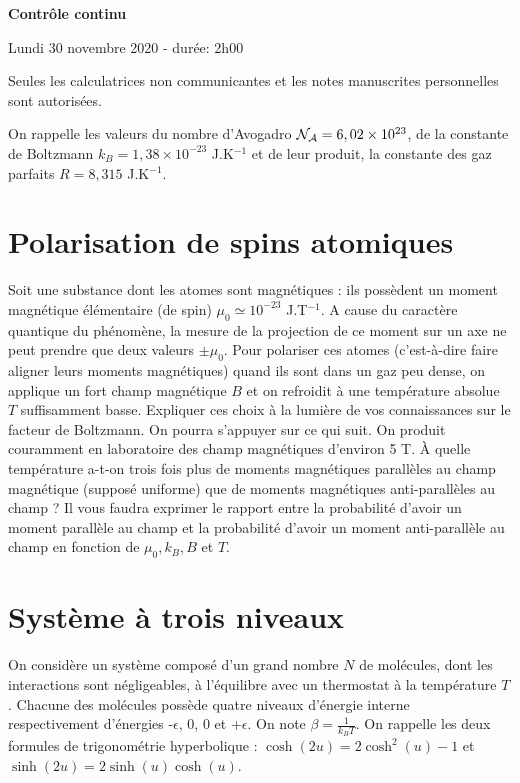 \documentclass[utf8, 11pt]{feuille}
\begin{document}
\begin{center}
    \Large {\bf Contrôle continu}
    
    Lundi 30 novembre 2020 - durée: 2h00
\end{center}

Seules les calculatrices non communicantes et les notes manuscrites personnelles sont autorisées.

On rappelle les valeurs du nombre d'Avogadro ${\cal N_A}=6,02 \times 10^{23}$, de la constante de Boltzmann $k_B=1,38 \times 10^{-23}$ J.K$^{-1}$ et de leur produit, la constante des gaz parfaits $R=8,315$ J.K$^{-1}$.



\section{Polarisation de spins atomiques}

Soit une substance dont les atomes sont magnétiques : ils possèdent un moment magnétique élémentaire (de spin) $\mu_0 \simeq 10^{-23}$ J.T$^{-1}$. A cause du caractère quantique du phénomène, la mesure de la projection de ce moment sur un axe ne peut prendre que deux valeurs $\pm \mu_0$. Pour polariser ces atomes (c'est-à-dire faire aligner leurs moments magnétiques) quand ils sont dans un gaz peu dense, on applique un fort champ magnétique $B$ et on refroidit à une température absolue $T$ suffisamment basse. Expliquer ces choix à la lumière de vos connaissances sur le facteur de Boltzmann. On pourra s'appuyer sur ce qui suit.
On produit couramment en laboratoire des champ magnétiques d'environ  5 T. \`A quelle température a-t-on trois fois plus de moments magnétiques parallèles au champ magnétique (supposé uniforme) que de moments magnétiques anti-parallèles au champ ? Il vous faudra exprimer le rapport entre la probabilité d'avoir un moment parallèle au champ et la probabilité d'avoir un moment anti-parallèle au champ en fonction de $\mu_0, k_B, B$ et $T$.



\section{Système à trois niveaux}

On considère un système composé d'un grand nombre $N$ de molécules, dont les interactions sont négligeables, à l'équilibre avec un thermostat à la température $T$. Chacune des molécules possède quatre niveaux d'énergie \og interne \fg \, respectivement d'énergies -$\epsilon$, 0, 0 et  +$\epsilon$. On note $\beta=\frac{1}{k_B T}$. On rappelle les deux formules de trigonométrie hyperbolique : $\cosh(2u)=2 \cosh^2(u)-1$ et $\sinh(2u)=2 \sinh(u)\cosh(u)$.
\end{document}

